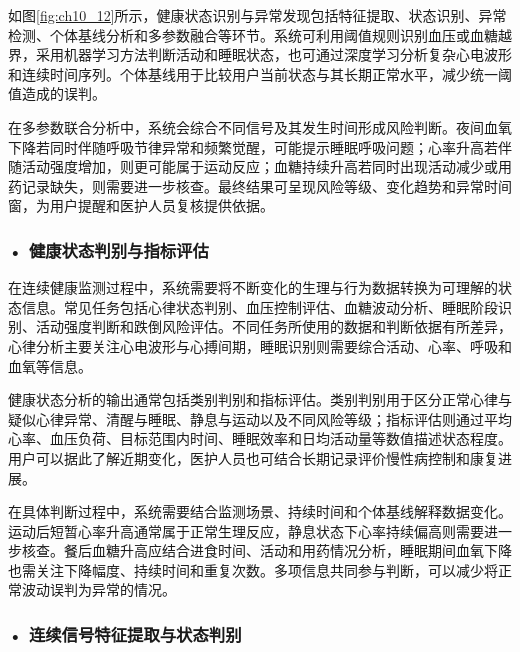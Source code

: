 如图\ref{fig:ch10_12}所示，健康状态识别与异常发现包括特征提取、状态识别、异常检测、个体基线分析和多参数融合等环节。系统可利用阈值规则识别血压或血糖越界，采用机器学习方法判断活动和睡眠状态，也可通过深度学习分析复杂心电波形和连续时间序列。个体基线用于比较用户当前状态与其长期正常水平，减少统一阈值造成的误判。

在多参数联合分析中，系统会综合不同信号及其发生时间形成风险判断。夜间血氧下降若同时伴随呼吸节律异常和频繁觉醒，可能提示睡眠呼吸问题；心率升高若伴随活动强度增加，则更可能属于运动反应；血糖持续升高若同时出现活动减少或用药记录缺失，则需要进一步核查。最终结果可呈现风险等级、变化趋势和异常时间窗，为用户提醒和医护人员复核提供依据。


\par
\noindent\begin{minipage}{\textwidth}
\centering
{}
\label{fig:ch10_12}
\end{minipage}
\par

\subsubsection*{\textbf{• 健康状态判别与指标评估}}

在连续健康监测过程中，系统需要将不断变化的生理与行为数据转换为可理解的状态信息。常见任务包括心律状态判别、血压控制评估、血糖波动分析、睡眠阶段识别、活动强度判断和跌倒风险评估。不同任务所使用的数据和判断依据有所差异，心律分析主要关注心电波形与心搏间期，睡眠识别则需要综合活动、心率、呼吸和血氧等信息。

健康状态分析的输出通常包括类别判别和指标评估。类别判别用于区分正常心律与疑似心律异常、清醒与睡眠、静息与运动以及不同风险等级；指标评估则通过平均心率、血压负荷、目标范围内时间、睡眠效率和日均活动量等数值描述状态程度。用户可以据此了解近期变化，医护人员也可结合长期记录评价慢性病控制和康复进展。

在具体判断过程中，系统需要结合监测场景、持续时间和个体基线解释数据变化。运动后短暂心率升高通常属于正常生理反应，静息状态下心率持续偏高则需要进一步核查。餐后血糖升高应结合进食时间、活动和用药情况分析，睡眠期间血氧下降也需关注下降幅度、持续时间和重复次数。多项信息共同参与判断，可以减少将正常波动误判为异常的情况。


\subsubsection*{\textbf{• 连续信号特征提取与状态判别}}

